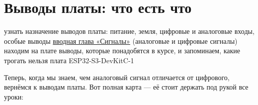 \begingroup
\renewcommand{\thefigure}{П.\arabic{figure}}
\renewcommand{\thetable}{П.\arabic{table}}
\renewcommand{\theHfigure}{intro-pins.\arabic{figure}}
\setcounter{figure}{0}\setcounter{table}{0}
\section*{Выводы платы: что есть что}
\label{les:pins}
\lessonintro
  {узнать назначение выводов платы: питание, земля, цифровые и аналоговые входы, особые выводы}
  {\hyperref[les:signals]{вводная глава «Сигналы»} (аналоговые и цифровые сигналы)}
  {находим на плате выводы, которые понадобятся в курсе, и запоминаем, какие трогать нельзя}
  {плата ESP32-S3-DevKitC-1}

Теперь, когда мы знаем, чем аналоговый сигнал отличается от цифрового, вернёмся к выводам
платы. Вот полная карта --- её стоит держать под рукой все уроки:

